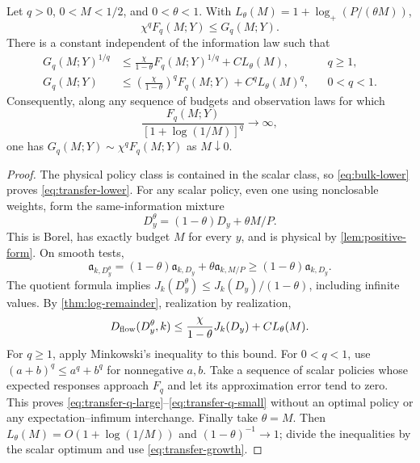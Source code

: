 \begin{theorem}
\label{thm:optimal-transfer}
Let $q>0$, $0<M<1/2$, and $0<\theta<1$. With
$L_\theta(M)=1+\log_+(P/(\theta M))$,
\begin{equation}\label{eq:transfer-lower}
 \chi^qF_q(M;Y)\le G_q(M;Y).
\end{equation}
There is a constant independent of the information law such that
\begin{align}
 G_q(M;Y)^{1/q}
 &\le\frac{\chi}{1-\theta}F_q(M;Y)^{1/q}+C L_\theta(M),
                  &&q\ge1,\label{eq:transfer-q-large}\\
 G_q(M;Y)
 &\le\left(\frac{\chi}{1-\theta}\right)^qF_q(M;Y)
                         +C^q L_\theta(M)^q,
                  &&0<q<1.\label{eq:transfer-q-small}
\end{align}
Consequently, along any sequence of budgets and observation laws for which
\begin{equation}\label{eq:transfer-growth}
 \frac{F_q(M;Y)}{[1+\log(1/M)]^q}\longrightarrow\infty,
\end{equation}
one has $G_q(M;Y)\sim\chi^qF_q(M;Y)$ as $M\downarrow0$.
\end{theorem}
\begin{proof}
The physical policy class is contained in the scalar class, so
\eqref{eq:bulk-lower} proves \eqref{eq:transfer-lower}. For any scalar
policy, even one using nonclosable weights, form the same-information
mixture
\begin{equation}\label{eq:mixture}
 D_y^\theta=(1-\theta)D_y+\theta M/P.
\end{equation}
This is Borel, has exactly budget $M$ for every $y$, and is physical by
\cref{lem:positive-form}. On smooth tests,
\[
 \mathfrak a_{k,D_y^\theta}
 =(1-\theta)\mathfrak a_{k,D_y}
       +\theta\mathfrak a_{k,M/P}
 \ge(1-\theta)\mathfrak a_{k,D_y}.
\]
The quotient formula implies
$J_k(D_y^\theta)\le J_k(D_y)/(1-\theta)$, including infinite values.
By \cref{thm:log-remainder}, realization by realization,
\begin{equation}\label{eq:mixture-physical}
 D_{\mathrm{flow}}(D_y^\theta,k)
 \le\frac{\chi}{1-\theta}J_k(D_y)+C L_\theta(M).
\end{equation}
For $q\ge1$, apply Minkowski's inequality to this bound. For $0<q<1$,
use $(a+b)^q\le a^q+b^q$ for nonnegative $a,b$. Take a sequence of
scalar policies whose expected responses approach $F_q$ and let its
approximation error tend to zero. This proves
\eqref{eq:transfer-q-large}--\eqref{eq:transfer-q-small} without an
optimal policy or any expectation--infimum interchange.
Finally take $\theta=M$. Then $L_\theta(M)=O(1+\log(1/M))$ and
$(1-\theta)^{-1}\to1$; divide the inequalities by the scalar optimum
and use \eqref{eq:transfer-growth}.
\end{proof}

